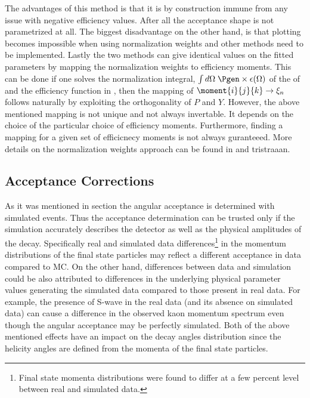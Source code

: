 The advantages of this method is that it is by construction immune from any issue with negative efficiency values.
After all the acceptance shape is not parametrized at all. The biggest disadvantage on the other hand, is that plotting becomes impossible
when using normalization weights and other methods need to be implemented. Lastly the two methods can give identical values on the
fitted parameters by mapping the normalization weights to efficiency moments. This can be done if one solves the normalization integral,
$\int d\Omega\;\Pgen\times\epsilon(\Omega)$ of the \pdf of  and the efficiency function in ,
then the mapping of $\moment{i}{j}{k} \rightarrow \xi_n$ follows naturally by exploiting the orthogonality of $P$ and $Y$.
However, the above mentioned mapping is not unique and not always invertable. It depends on the choice of the particular choice
of efficiency moments. Furthermore, finding a mapping for a given set of efficicnecy moments is not always guranteeed.
More details on the normalization weights approach can be found in \cite{jeroenThesis} {\color{red} and tristraaan}.

\subsection{Acceptance Corrections}
\label{Accceptance_Corrections}
As it was mentioned in section  the angular acceptance is determined with simulated \BsJpsiKst events.
Thus the acceptance determination can be trusted only if the simulation accurately describes the detector as well as the
physical amplitudes of the \BsJpsiKst decay. Specifically real and simulated data differences\footnote{Final state momenta distributions were found to differ at a few
percent level between real and simulated data.} in the momentum distributions
of the final state particles  may reflect a different acceptance in data compared to MC. On the other hand,
differences between data and simulation could be also attributed to differences in the underlying physical parameter values generating
the simulated data compared to those present in real data. For example, the presence of S-wave in the real data (and its absence on simulated data)
can cause a difference in the observed kaon momentum spectrum even though the angular acceptance may be perfectly simulated.
Both of the above mentioned effects have an impact on the decay angles distribution since the helicity angles are defined
from the momenta of the final state particles.

